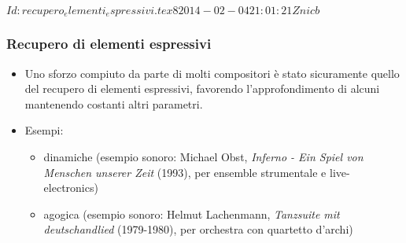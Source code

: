 %
%
\svnInfo $Id: recupero_elementi_espressivi.tex 8 2014-02-04 21:01:21Z nicb $

\setcounter{ms}{0}
\begin{frame}
    \frametitle{Recupero di elementi espressivi}

    \begin{itemize}

        \item Uno sforzo compiuto da parte di molti compositori
            \`e stato sicuramente quello del recupero di elementi espressivi,
            favorendo l'approfondimento di alcuni
            mantenendo costanti altri parametri.

       \item Esempi:

        \begin{itemize}

            \item dinamiche (esempio sonoro:
                Michael Obst,
                \emph{Inferno - Ein Spiel von Menschen unserer Zeit} (1993),
                per ensemble strumentale e live-electronics)

            \item agogica (esempio sonoro:
                Helmut Lachenmann,
                \emph{Tanzsuite mit deutschandlied} (1979-1980),
                per orchestra con quartetto d'archi)

        \end{itemize}


    \end{itemize}

\end{frame}
